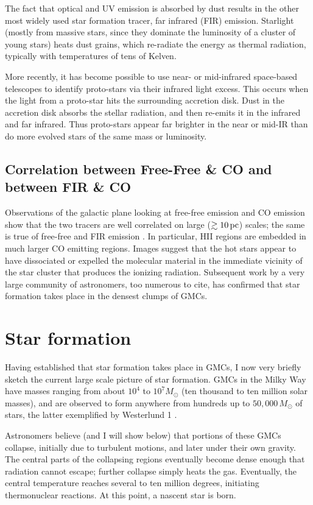 \documentclass[../dissertation.tex]{subfiles}
\begin{document}
The fact that optical and UV emission is absorbed by dust results in the other most widely used star formation tracer, far infrared (FIR) emission. Starlight (mostly from massive stars, since they dominate the luminosity of a cluster of young stars) heats dust grains, which re-radiate the energy as thermal radiation, typically with temperatures of tens of Kelven. 

More recently, it has become possible to use near- or mid-infrared space-based telescopes to identify proto-stars via their infrared light excess. 
This occurs when the light from a proto-star hits the surrounding accretion disk. Dust in the accretion disk absorbs the stellar radiation, and then re-emits it in the infrared and far infrared. Thus proto-stars appear far brighter in the near or mid-IR than do more evolved stars of the same mass or luminosity. 

\subsection{Correlation between Free-Free \& CO and between FIR \& CO} \label{sec:Intro_FF_and_CO}

Observations of the galactic plane looking at free-free emission and CO emission show that the two tracers are well correlated on large ($\gtrsim 10 \,\rm pc$) scales; the same is true of free-free and FIR emission \citep{1989ApJ...339..149S,1988ApJ...334L..51M}. In particular, HII regions are embedded in much larger CO emitting regions. Images suggest that the hot stars appear to have dissociated or expelled the molecular material in the immediate vicinity of the star cluster that produces the ionizing radiation.
Subsequent work by a very large community of astronomers, too numerous to cite, has confirmed that star formation takes place in the densest clumps of GMCs.


\section{Star formation}
Having established that star formation takes place in GMCs, I now very briefly sketch the current large scale picture of star formation.
GMCs in the Milky Way have masses ranging from about $10^4$ to $10^7M_\odot$ (ten thousand to ten million solar masses), 
and are observed to form anywhere from hundreds up to $50,000\,M_\odot$ of stars, the latter exemplified by Westerlund 1 \citep{2017A&A...602A..22A}. 

Astronomers believe (and I will show below) that portions of these
GMCs collapse, initially due to turbulent motions, and later under
their own gravity.  The central parts of the collapsing regions
eventually become dense enough that radiation cannot escape; further
collapse simply heats the gas.  Eventually, the central temperature reaches
several to ten million degrees, initiating thermonuclear reactions.
At this point, a nascent star is born.
\end{document}
